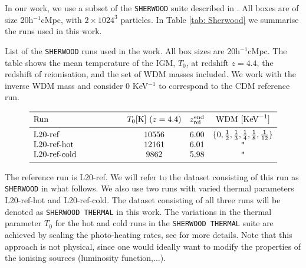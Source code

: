 In our work, we use a subset of the \texttt{SHERWOOD} suite described in \cite{sherwood_wdm}. All boxes are of size 20h$^{-1}$cMpc, with $2\times 1024^3$ particles. In Table \ref{tab: Sherwood} we summarise the runs used in this work.


\begin{table}
        \caption[]{List of the \texttt{SHERWOOD} runs used in the work.
        All box sizes are 20h$^{-1}$cMpc. The table shows the mean temperature of the IGM, $T_0$, at redshift $z=4.4$, the redshift of reionisation, and the set of WDM masses included. We work with the inverse WDM mass and consider 0 KeV$^{-1}$ to correspond to the CDM reference run.}
           \label{tab: Sherwood}
       $$ 
           \begin{array}{p{0.3\linewidth}ccc}
              \hline
              \noalign{\smallskip}
              Run      &  T_0 {[\mathrm{K}]}\ (z=4.4) &z_\mathrm{rei}^\mathrm{end}& \mathrm{WDM}\ [\mathrm{KeV}^{-1}] \\ 
              \noalign{\smallskip}
              \hline
              \noalign{\smallskip}
              L20-ref & 10556 &6.00&\{0,\frac{1}{2}, \frac{1}{3}, \frac{1}{4}, \frac{1}{8}, \frac{1}{12} \}     \\
              L20-ref-hot           & 12161&6.01  &\texttt{"}\\
              L20-ref-cold     & 9862  &5.98&       \texttt{"}     \\
              \noalign{\smallskip}
              \hline
           \end{array}
       $$ 
     \end{table}
The reference run is L20-ref. We will refer to the dataset consisting of this run as \texttt{SHERWOOD} in what follows. We also use two runs with varied thermal parameters L20-ref-hot and L20-ref-cold. The dataset consisting of all three runs will be denoted as \texttt{SHERWOOD THERMAL} in this work. The variations in the thermal parameter $T_0$ for the hot and cold runs in the \texttt{SHERWOOD THERMAL} suite are achieved by scaling the photo-heating rates, see \cite{Gaikwad_2021} for more details. Note that this approach is not physical, since one would ideally want to modify the properties of the ionising sources (luminosity function,...).

